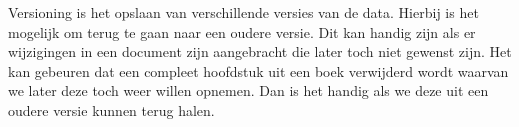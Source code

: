 Versioning is het opslaan van verschillende versies van de data. Hierbij is het mogelijk om terug te gaan naar een oudere versie. Dit kan handig zijn als er wijzigingen in een document zijn aangebracht die later toch niet gewenst zijn. Het kan gebeuren dat een compleet hoofdstuk uit een boek verwijderd wordt waarvan we later deze toch weer willen opnemen. Dan is het handig als we deze uit een oudere versie kunnen terug halen.

